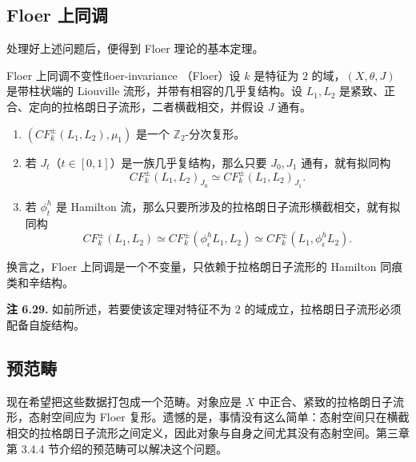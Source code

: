 \subsection{Floer 上同调}\label{subsec:floer-cohomology}
处理好上述问题后，便得到 Floer 理论的基本定理。

\begin{theorem}{Floer 上同调不变性}{floer-invariance}
（Floer）设 $k$ 是特征为 $2$ 的域，$(X,\theta,J)$ 是带柱状端的 Liouville 流形，并带有相容的几乎复结构。设 $L_1,L_2$ 是紧致、正合、定向的拉格朗日子流形，二者横截相交，并假设 $J$ 通有。
\begin{enumerate}[label=(\roman*)]
  \item $(CF_k^{\pm}(L_1,L_2),\mu_1)$ 是一个 $\mathbb Z_2$-分次复形。
  \item 若 $J_t$（$t\in[0,1]$）是一族几乎复结构，那么只要 $J_0,J_1$ 通有，就有拟同构
  \[
    CF_k^{\pm}(L_1,L_2)_{J_0}\simeq CF_k^{\pm}(L_1,L_2)_{J_1}.
  \]
  \item 若 $\phi_t^h$ 是 Hamilton 流，那么只要所涉及的拉格朗日子流形横截相交，就有拟同构
  \[
    CF_k^{\pm}(L_1,L_2)\simeq
    CF_k^{\pm}(\phi_\epsilon^hL_1,L_2)\simeq
    CF_k^{\pm}(L_1,\phi_\epsilon^hL_2).
  \]
\end{enumerate}
换言之，Floer 上同调是一个不变量，只依赖于拉格朗日子流形的 Hamilton 同痕类和辛结构。
\end{theorem}

\begin{note}\label{note:floer-spin-structure}
\textbf{注 6.29.} 如前所述，若要使该定理对特征不为 $2$ 的域成立，拉格朗日子流形必须配备自旋结构。
\end{note}

\subsection{预范畴}\label{subsec:fukaya-precategories}
现在希望把这些数据打包成一个范畴。对象应是 $X$ 中正合、紧致的拉格朗日子流形，态射空间应为 Floer 复形。遗憾的是，事情没有这么简单：态射空间只在横截相交的拉格朗日子流形之间定义，因此对象与自身之间尤其没有态射空间。第三章第 3.4.4 节介绍的预范畴可以解决这个问题。


